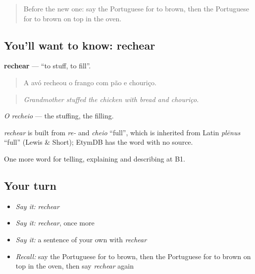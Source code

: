 \label{lesson:PT-C334-rechear}



\begin{quote}
Before the new one: say the Portuguese for to brown, then the Portuguese for to brown on top in the oven.
\end{quote}

\subsection*{You'll want to know: rechear}
\textbf{rechear} — \textquotedblleft{}to stuff, to fill\textquotedblright{}.

\begin{quote}
A avó recheou o frango com pão e chouriço.
\end{quote}

\begin{quote}
\emph{Grandmother stuffed the chicken with bread and chouriço.}
\end{quote}

\emph{O recheio} — the stuffing, the filling.

\begin{cousinweb}
\emph{rechear} is built from \emph{re-} and \emph{cheio} \textquotedblleft{}full\textquotedblright{}, which is inherited from Latin \emph{plēnus} \textquotedblleft{}full\textquotedblright{} (Lewis \& Short); EtymDB has the word with no source.
\end{cousinweb}

\begin{grammarlens}[title={What you've built}]
One more word for telling, explaining and describing at B1.
\end{grammarlens}

\subsection*{Your turn}
\begin{itemize}
\raggedright
  \item \emph{Say it:} \emph{rechear}
  \item \emph{Say it:} \emph{rechear}, once more
  \item \emph{Say it:} a sentence of your own with \emph{rechear}
  \item \emph{Recall:} say the Portuguese for to brown, then the Portuguese for to brown on top in the oven, then say \emph{rechear} again
\end{itemize}

